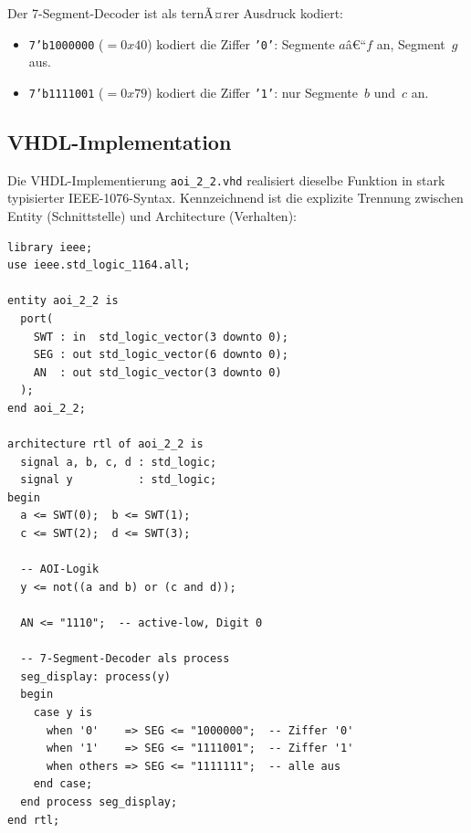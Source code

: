 ﻿\documentclass[12pt,a4paper]{report}
\begin{document}
Der 7-Segment-Decoder ist als ternÃ¤rer Ausdruck kodiert:
\begin{itemize}
    \item \texttt{7'b1000000} ($=0x40$) kodiert die Ziffer \texttt{'0'}: Segmente $a$â€“$f$
          an, Segment~$g$ aus.
    \item \texttt{7'b1111001} ($=0x79$) kodiert die Ziffer \texttt{'1'}: nur
          Segmente~$b$ und~$c$ an.
\end{itemize}

\subsection{VHDL-Implementation}
\label{sssec:aoi_vhdl}

Die VHDL-Implementierung \texttt{aoi\_2\_2.vhd} realisiert dieselbe Funktion
in stark typisierter IEEE-1076-Syntax. Kennzeichnend ist die explizite
Trennung zwischen Entity (Schnittstelle) und Architecture (Verhalten):

\begin{lstlisting}[style=hdlstyle, caption={VHDL-Implementation des AOI-2-2-Schaltkreises (\texttt{aoi\_2\_2.vhd})}]
library ieee;
use ieee.std_logic_1164.all;

entity aoi_2_2 is
  port(
    SWT : in  std_logic_vector(3 downto 0);
    SEG : out std_logic_vector(6 downto 0);
    AN  : out std_logic_vector(3 downto 0)
  );
end aoi_2_2;

architecture rtl of aoi_2_2 is
  signal a, b, c, d : std_logic;
  signal y          : std_logic;
begin
  a <= SWT(0);  b <= SWT(1);
  c <= SWT(2);  d <= SWT(3);

  -- AOI-Logik
  y <= not((a and b) or (c and d));

  AN <= "1110";  -- active-low, Digit 0

  -- 7-Segment-Decoder als process
  seg_display: process(y)
  begin
    case y is
      when '0'    => SEG <= "1000000";  -- Ziffer '0'
      when '1'    => SEG <= "1111001";  -- Ziffer '1'
      when others => SEG <= "1111111";  -- alle aus
    end case;
  end process seg_display;
end rtl;
\end{lstlisting}
\end{document}
